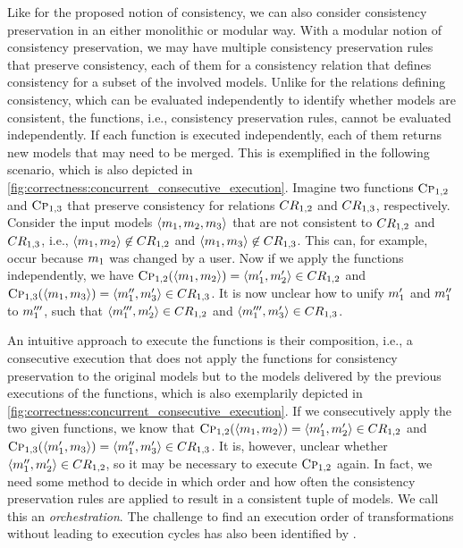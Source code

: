 Like for the proposed notion of consistency, we can also consider consistency preservation in an either monolithic or modular way.
With a modular notion of consistency preservation, we may have multiple consistency preservation rules that preserve consistency, each of them for a consistency relation that defines consistency for a subset of the involved models.
Unlike for the relations defining consistency, which can be evaluated independently to identify whether models are consistent, the functions, i.e., consistency preservation rules, cannot be evaluated independently.
If each function is executed independently, each of them returns new models that may need to be merged. 
This is exemplified in the following scenario, which is also depicted in \autoref{fig:correctness:concurrent_consecutive_execution}.
Imagine two functions $\textsc{Cp}_{1,2}$ and $\textsc{Cp}_{1,3}$ that preserve consistency for relations $\consistencyrelation{CR}{1,2}$ and $\consistencyrelation{CR}{1,3}$, respectively.
Consider the input models $\tupled{\model{m}{1}, \model{m}{2}, \model{m}{3}}$ that are not consistent to $\consistencyrelation{CR}{1,2}$ and $\consistencyrelation{CR}{1,3}$, i.e., $\tupled{\model{m}{1},\model{m}{2}} \not\in \consistencyrelation{CR}{1,2}$ and $\tupled{\model{m}{1},\model{m}{3}} \not\in \consistencyrelation{CR}{1,3}$.
This can, for example, occur because $\model{m}{1}$ was changed by a user.
Now if we apply the functions independently, we have $\function{Cp}_{1,2}(\tupled{\model{m}{1}, \model{m}{2}}) = \tupled{\model{m}{1}', \model{m}{2}'} \in \consistencyrelation{CR}{1,2}$ and 
$\function{Cp}_{1,3}(\tupled{\model{m}{1}, \model{m}{3}}) = \tupled{\model{m}{1}'', \model{m}{3}'} \in \consistencyrelation{CR}{1,3}$.
It is now unclear how to unify $\model{m}{1}'$ and $\model{m}{1}''$ to $\model{m}{1}'''$, such that $\tupled{\model{m}{1}''', \model{m}{2}'} \in \consistencyrelation{CR}{1,2}$ and  $\tupled{\model{m}{1}''', \model{m}{3}'} \in \consistencyrelation{CR}{1,3}$.

An intuitive approach to execute the functions is their composition, i.e., a consecutive execution that does not apply the functions for consistency preservation to the original models but to the models delivered by the previous executions of the functions, which is also exemplarily depicted in \autoref{fig:correctness:concurrent_consecutive_execution}.
If we consecutively apply the two given functions, we know that $\function{Cp}_{1,2}(\tupled{\model{m}{1}, \model{m}{2}}) = \tupled{\model{m}{1}', \model{m}{2}'} \in \consistencyrelation{CR}{1,2}$ and 
$\function{Cp}_{1,3}(\tupled{\model{m}{1}', \model{m}{3}}) = \tupled{\model{m}{1}'', \model{m}{3}'} \in \consistencyrelation{CR}{1,3}$.
It is, however, unclear whether $\tupled{\model{m}{1}'', \model{m}{2}'} \in \consistencyrelation{CR}{1,2}$, so it may be necessary to execute $\textsc{Cp}_{1,2}$ again.
In fact, we need some method to decide in which order and how often the consistency preservation rules are applied to result in a consistent tuple of models.
We call this an \emph{orchestration}.
The challenge to find an execution order of transformations without leading to execution cycles has also been identified by \textcite[Sec.~3.9]{kramer2017a}.

